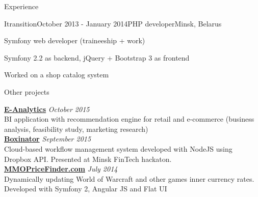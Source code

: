 \documentclass{resume} %
\begin{document}
\begin{rSection}{Experience}

\begin{rSubsection}{Itransition}{October 2013 - January 2014}{PHP developer}{Minsk, Belarus}
\item Symfony web developer (traineeship + work)
\item Symfony 2.2 as backend, jQuery + Bootstrap 3 as frontend
\item Worked on a shop catalog system
\end{rSubsection}

\end{rSection}


\begin{rSection}{Other projects}

{\bf \href{http://pirateminds.com/e-analytics}{E-Analytics}} \hfill {\em October 2015} \\ 
BI application with recommendation engine for retail and e-commerce (business analysis, feasibility study, marketing research) \\

{\bf \href{http://boxinator.xyz}{Boxinator}} \hfill {\em September 2015} \\ 
Cloud-based workflow management system developed with NodeJS using Dropbox API. Presented at Minsk FinTech hackaton. \\

{\bf \href{http://mmopricefinder.com}{MMOPriceFinder.com}} \hfill {\em July 2014} \\ 
Dynamically updating World of Warcraft and other games inner currency rates. Developed with Symfony 2, Angular JS and Flat UI \\

\end{rSection}



\end{document}
